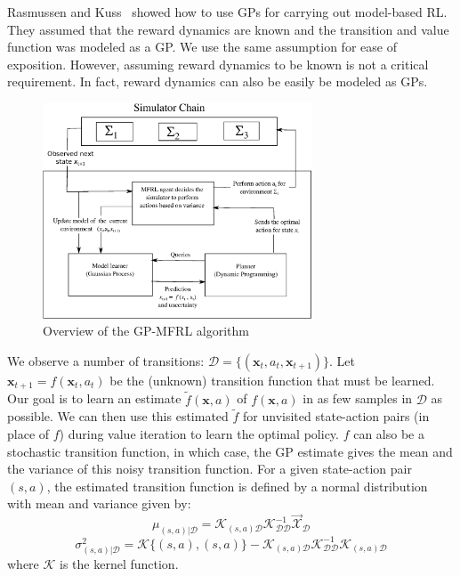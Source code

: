 \documentclass[12pt]{report}
\begin{document}
Rasmussen and Kuss~\cite{rasmussen2003gaussian} showed how to use GPs for carrying out model-based RL. They assumed that the reward dynamics are known and the transition and value function was modeled as a GP. We use the same assumption for ease of exposition. However, assuming reward dynamics to be known is not a critical requirement. In fact, reward dynamics can also be easily be modeled as GPs.

\begin{figure}[htp]
	\centering
	\includegraphics[width=8cm]{gp-mfrl.eps}
	\caption {Overview of the GP-MFRL algorithm }
   \label{fig:gp_mfrl_system}
\end{figure}

We observe a number of transitions: $\mathcal{D} = \{(\textbf{x}_t, a_t, \textbf{x}_{t+1})\}$. Let $\textbf{x}_{t+1} = f(\textbf{x}_t, a_t)$ be the (unknown) transition function that must be learned. Our goal is to learn an estimate $\tilde{f}(\textbf{x}, a)$ of $f(\textbf{x}, a)$ in as few samples in $\mathcal{D}$ as possible. We can then use this estimated $\tilde{f}$ for unvisited state-action pairs (in place of $f$) during value iteration to learn the optimal policy. $f$ can also be a stochastic transition function, in which case, the GP estimate gives the mean and the variance of this noisy transition function. For a given state-action pair $(s,a)$, the estimated transition function is defined by a normal distribution with mean and variance given by:
\begin{equation}\label{gaussian_mean}
\mu_{(s,a)|\mathcal{D}} = \mathcal{K}_{(s,a)\mathcal{D}}\mathcal{K}^{-1}_{\mathcal{D}\mathcal{D}}\vec{\mathcal{X}}_{\mathcal{D}} 
\end{equation}
\begin{equation}\label{gaussian_variance}
\sigma^2_{(s,a)|\mathcal{D}} = \mathcal{K}\{(s,a),(s,a)\}-\mathcal{K}_{(s,a)\mathcal{D}}\mathcal{K}^{-1}_{\mathcal{D}\mathcal{D}}\mathcal{K}_{(s,a)\mathcal{D}}
\end{equation}
where $\mathcal{K}$ is the kernel function.
\end{document}
